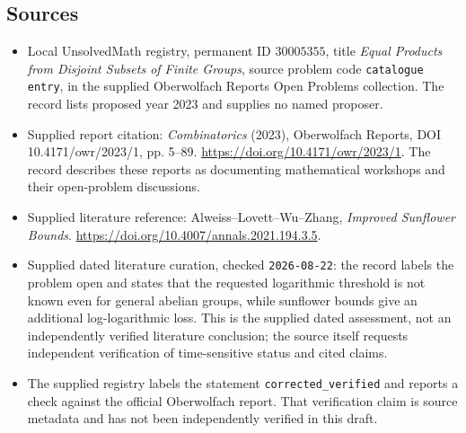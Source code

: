 \documentclass[11pt]{article}
\begin{document}
\subsection{Sources}
\begin{itemize}
\item Local UnsolvedMath registry, permanent ID \(30005355\), title \emph{Equal Products from Disjoint Subsets of Finite Groups}, source problem code \texttt{catalogue entry}, in the supplied Oberwolfach Reports Open Problems collection. The record lists proposed year 2023 and supplies no named proposer.
\item Supplied report citation: \emph{Combinatorics} (2023), Oberwolfach Reports, DOI 10.4171/owr/2023/1, pp. 5--89. \url{https://doi.org/10.4171/owr/2023/1}. The record describes these reports as documenting mathematical workshops and their open-problem discussions.
\item Supplied literature reference: Alweiss--Lovett--Wu--Zhang, \emph{Improved Sunflower Bounds}. \url{https://doi.org/10.4007/annals.2021.194.3.5}.
\item Supplied dated literature curation, checked \texttt{2026-08-22}: the record labels the problem open and states that the requested logarithmic threshold is not known even for general abelian groups, while sunflower bounds give an additional log-logarithmic loss. This is the supplied dated assessment, not an independently verified literature conclusion; the source itself requests independent verification of time-sensitive status and cited claims.
\item The supplied registry labels the statement \texttt{corrected\_verified} and reports a check against the official Oberwolfach report. That verification claim is source metadata and has not been independently verified in this draft.
\end{itemize}
\end{document}
